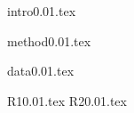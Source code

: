 \documentclass[useAMS,usenatbib]{mn2e}
\begin{document}
{intro0.01.tex}


{method0.01.tex}


{data0.01.tex}

{R10.01.tex}
{R20.01.tex}
\end{document}
